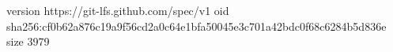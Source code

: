version https://git-lfs.github.com/spec/v1
oid sha256:cf0b62a876c19a9f56cd2a0c64e1bfa50045e3c701a42bdc0f68c6284b5d836e
size 3979
